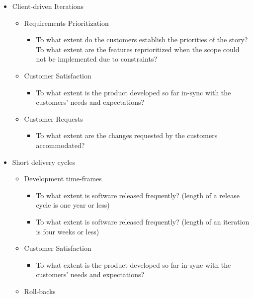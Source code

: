 \begin{itemize}
\begin{itemize}
\begin{itemize}
				\end{itemize}
		\end{itemize}
	\item Client-driven Iterations
		\begin{itemize}
			\item Requirements Prioritization
				\begin{itemize}
					\item To what extent do the customers establish the priorities of the story?
					\addition To what extent are the features reprioritized when the scope could not be implemented due to constraints?
				\end{itemize}
			\item Customer Satisfaction
				\begin{itemize}
					\item To what extent is the product developed so far in-sync with the customers' needs and expectations?
				\end{itemize}
			\item Customer Requests
				\begin{itemize}
					\item To what extent are the changes requested by the customers accommodated?
				\end{itemize}			
		\end{itemize}
	\item Short delivery cycles
		\begin{itemize}
			\item Development time-frames
				\begin{itemize}
					\item To what extent is software released frequently? (length of a release cycle is one year or less)
					\item To what extent is software released frequently? (length of an iteration is four weeks or less)
				\end{itemize}
			\item Customer Satisfaction
				\begin{itemize}
					\item To what extent is the product developed so far in-sync with the customers' needs and expectations?
				\end{itemize}
			\item Roll-backs
				\begin{itemize}

\end{itemize}
\end{itemize}
\end{itemize}
